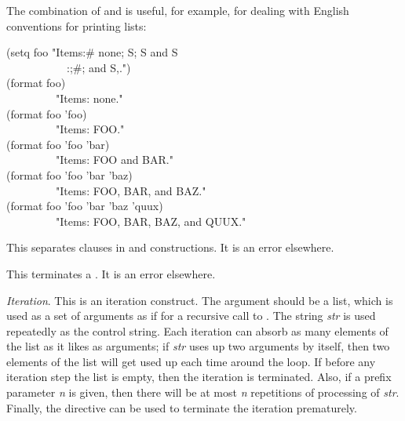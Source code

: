 \begin{flushdesc}
The combination of \cd{{\Xtilde}{\Xlbracket}} and \cd{\#} is useful, for
example, for dealing with English conventions for printing lists:
\begin{lisp}
(setq foo "Items:{\Xtilde}\#{\Xlbracket} none{\Xtilde}; {\Xtilde}S{\Xtilde}; {\Xtilde}S and {\Xtilde}S{\Xtilde} \\
~~~~~~~~~~~{\Xtilde}:;{\Xtilde}{\Xatsign}{\Xlbrace}{\Xtilde}\#{\Xlbracket}{\Xtilde}; and{\Xtilde}{\Xrbracket}
{\Xtilde}S{\Xtilde}{\Xcircumflex},{\Xtilde}{\Xrbrace}{\Xtilde}{\Xrbracket}.") \\
(format {\false} foo) \\ ~~~~~~~~\EV\  "Items: none." \\
(format {\false} foo 'foo) \\
~~~~~~~~\EV\  "Items: FOO." \\
(format {\false} foo 'foo 'bar) \\
~~~~~~~~\EV\  "Items: FOO and BAR." \\
(format {\false} foo 'foo 'bar 'baz) \\
~~~~~~~~\EV\  "Items: FOO, BAR, and BAZ." \\
(format {\false} foo 'foo 'bar 'baz 'quux) \\
~~~~~~~~\EV\  "Items: FOO, BAR, BAZ, and QUUX."
\end{lisp}

\item[\cd{{\Xtilde};}]
This separates clauses in \cd{{\Xtilde}{\Xlbracket}} and \cd{{\Xtilde}<}
constructions.  It is an error elsewhere.

\item[\cd{{\Xtilde}{\Xrbracket}}]
This terminates a \cd{{\Xtilde}{\Xlbracket}}.  It is an error elsewhere.

\item[\cd{{\Xtilde}{\Xlbrace}{\it str}{\Xtilde}{\Xrbrace}}]
{\it Iteration}.
This is an iteration construct.  The argument should be a list,
which is used as a set of arguments as if for a recursive call to .
The string {\it str} is used repeatedly as the control string.
Each iteration can absorb as many elements of the list as it likes
as arguments;
if {\it str} uses up two arguments by itself, then two elements of the
list will get used up each time around the loop.
If before any iteration step the list is empty, then the iteration is terminated.
Also, if a prefix parameter {\it n} is given, then there will be at most {\it n}
repetitions of processing of {\it str}.  Finally, the
\cd{{\Xtilde}{\Xcircumflex}} directive can be used to terminate the iteration
prematurely.


\end{flushdesc}
